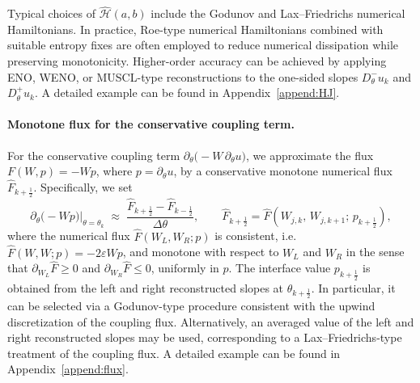 \documentclass[11pt, dina4, amsfont12]{article}
\begin{document}
Typical choices of $\widehat{\mathcal H}(a,b)$ include the Godunov and
Lax--Friedrichs numerical Hamiltonians. 
In practice, Roe-type numerical
Hamiltonians combined with suitable entropy fixes are often employed to reduce
numerical dissipation while preserving monotonicity. 
Higher-order accuracy can
be achieved by applying ENO, WENO, or MUSCL-type reconstructions to the one-sided
slopes $D_\theta^- u_k$ and $D_\theta^+ u_k$. 
A detailed example can be found in
Appendix~\ref{append:HJ}.


\paragraph{Monotone flux for the conservative coupling term.}
For the conservative coupling term
$\partial_\theta\!\bigl(- W\,\partial_\theta u\bigr)$,
we approximate the flux
$F(W,p)=- W p$, where $p=\partial_\theta u$, by a conservative
monotone numerical flux $\widehat F_{k+\frac12}$. Specifically, we set
\[
\partial_\theta\!\bigl(- W p\bigr)\Big|_{\theta=\theta_k}
\;\approx\;
\frac{\widehat F_{k+\frac12}-\widehat F_{k-\frac12}}{\Delta\theta},
\qquad
\widehat F_{k+\frac12}
=
\widehat F\!\left(W_{j,k},\,W_{j,k+1};\,p_{k+\frac12}\right),
\]
where the numerical flux $\widehat F(W_L,W_R;p)$ is consistent, i.e. $\widehat F(W,W;p) = -2\varepsilon W p$,
and monotone with respect to $W_L$ and $W_R$ in the sense that
$\partial_{W_L}\widehat F \ge 0$ and $\partial_{W_R}\widehat F \le 0$,
uniformly in $p$.
The interface value $p_{k+\frac12}$ is obtained from the left and right
reconstructed slopes at $\theta_{k+\frac12}$. In particular, it can be selected
via a Godunov-type procedure consistent with the upwind discretization of the
coupling flux. Alternatively, an averaged value of the left and right
reconstructed slopes may be used, corresponding to a Lax--Friedrichs-type
treatment of the coupling flux.
A detailed example can be found in
Appendix~\ref{append:flux}.
\end{document}
